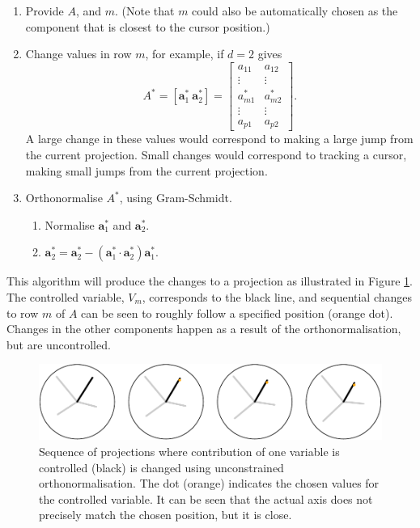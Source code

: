 \documentclass[]{interact}
\theoremstyle{plain}%
\theoremstyle{definition}
\theoremstyle{remark}
\providecommand{\tightlist}{%
  \setlength{\itemsep}{0pt}\setlength{\parskip}{0pt}}
\def\tightlist{}
\begin{document}
\begin{enumerate}
\def\labelenumi{\arabic{enumi}.}
\tightlist
\item
  Provide \(A\), and \(m\). (Note that \(m\) could also be automatically
  chosen as the component that is closest to the cursor position.)
\item
  Change values in row \(m\), for example, if \(d=2\) gives \[
  A^* = [ \boldsymbol{a}^*_1~\boldsymbol{a}^*_2 ] = \left[ \begin{array}{cc} a_{11} & a_{12}\\
                             \vdots & \vdots \\
                             a^*_{m1} & a^*_{m2}\\
                             \vdots & \vdots \\
                             a_{p1} & a_{p2} 
       \end{array}\right].
  \] \noindent A large change in these values would correspond to making
  a large jump from the current projection. Small changes would
  correspond to tracking a cursor, making small jumps from the current
  projection.
\item
  Orthonormalise \(A^*\), using Gram-Schmidt.

  \begin{enumerate}
  \def\labelenumii{\roman{enumii}.}
  \tightlist
  \item
    Normalise \(\boldsymbol{a}^*_1\) and \(\boldsymbol{a}^*_2\).
  \item
    \(\boldsymbol{a}^*_2 = \boldsymbol{a}^*_2 - (\boldsymbol{a}^*_1\cdot\boldsymbol{a}^*_2)\boldsymbol{a}^*_1\).
  \end{enumerate}
\end{enumerate}

This algorithm will produce the changes to a projection as illustrated
in Figure \ref{fig:manualsequence}. The controlled variable, \(V_m\),
corresponds to the black line, and sequential changes to row \(m\) of
\(A\) can be seen to roughly follow a specified position (orange dot).
Changes in the other components happen as a result of the
orthonormalisation, but are uncontrolled.

\begin{figure}
\includegraphics[width=1\linewidth]{paper_files/figure-latex/manualsequence-1} \caption{Sequence of projections where contribution of one variable is controlled (black) is changed using unconstrained orthonormalisation. The dot (orange) indicates the chosen values for the controlled variable. It can be seen that the actual axis does not precisely match the chosen position, but it is close.}\label{fig:manualsequence}
\end{figure}
\end{document}
